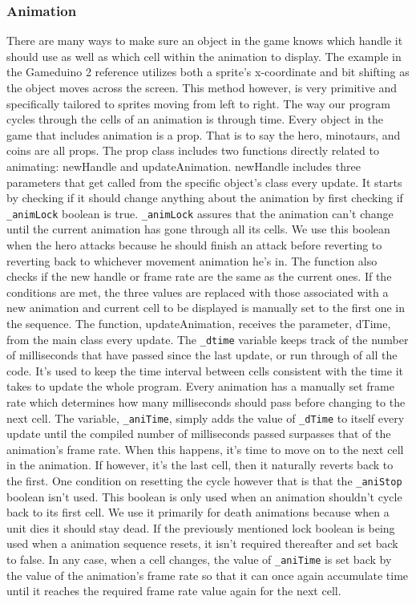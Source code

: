 \newpage
\subsubsection{Animation}
There are many ways to make sure an object in the game knows which handle it should use as well as which cell within the animation to display. The example in the Gameduino 2 reference utilizes both a sprite's x-coordinate and bit shifting as the object moves across the screen. This method however, is very primitive and specifically tailored to sprites moving from left to right. The way our program cycles through the cells of an animation is through time. \newline
Every object in the game that includes animation is a prop. That is to say the hero, minotaurs, and coins are all props. The prop class includes two functions directly related to animating: newHandle and updateAnimation. newHandle includes three parameters that get called from the specific object’s class every update. It starts by checking if it should change anything about the animation by first checking if {\tt \_animLock} boolean is true. {\tt \_animLock} assures that the animation can’t change until the current animation has gone through all its cells. We use this boolean when the hero attacks because he should finish an attack before reverting to reverting back to whichever movement animation he’s in. The function also checks if the new handle or frame rate are the same as the current ones. If the conditions are met, the three values are replaced with those associated with a new animation and current cell to be displayed is manually set to the first one in the sequence.\newline
The function, updateAnimation, receives the parameter, dTime, from the main class every update. The {\tt \_dtime} variable keeps track of the number of milliseconds that have passed since the last update, or run through of all the code. It’s used to keep the time interval between cells consistent with the time it takes to update the whole program. Every animation has a manually set frame rate which determines how many milliseconds should pass before changing to the next cell. The variable, {\tt \_aniTime}, simply adds the value of {\tt \_dTime} to itself every update until the compiled number of milliseconds passed surpasses that of the animation’s frame rate. When this happens, it’s time to move on to the next cell in the animation. If however, it’s the last cell, then it naturally reverts back to the first. One condition on resetting the cycle however that is that the {\tt \_aniStop} boolean isn’t used. This boolean is only used when an animation shouldn’t cycle back to its first cell. We use it primarily for death animations because when a unit dies it should stay dead. If the previously mentioned lock boolean is being used when a animation sequence resets, it isn’t required thereafter and set back to false. In any case, when a cell changes, the value of {\tt\_aniTime} is set back by the value of the animation’s frame rate so that it can once again accumulate time until it reaches the required frame rate value again for the next cell.

